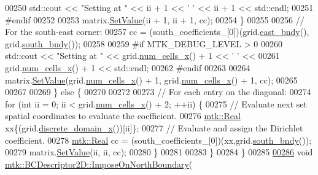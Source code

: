 \begin{DoxyCode}
00250       std::cout << \textcolor{stringliteral}{"Setting at "} << ii + 1 << \textcolor{charliteral}{' '} << ii + 1 << std::endl;
00251 \textcolor{preprocessor}{      #endif}
00252 
00253       matrix.\hyperlink{classmtk_1_1DenseMatrix_a784ce5784109ac86bfb9d8562b334b13}{SetValue}(ii + 1, ii + 1, cc);
00254     \}
00255 
00256     \textcolor{comment}{// For the south-east corner:}
00257     cc = (south\_coefficients\_[0])(grid.\hyperlink{classmtk_1_1UniStgGrid2D_a03f689eb29a6369b82ce1207c655d5ff}{east\_bndy}(), grid.\hyperlink{classmtk_1_1UniStgGrid2D_a1442eaf219f099d0ebf46a170fdebf92}{south\_bndy}());
00258 
00259 \textcolor{preprocessor}{    #if MTK\_DEBUG\_LEVEL > 0}
00260     std::cout << \textcolor{stringliteral}{"Setting at "} << grid.\hyperlink{classmtk_1_1UniStgGrid2D_a2d182866a398aba8e4829590e85bf939}{num\_cells\_x}() + 1 << \textcolor{charliteral}{' '} <<
00261       grid.\hyperlink{classmtk_1_1UniStgGrid2D_a2d182866a398aba8e4829590e85bf939}{num\_cells\_x}() + 1 << std::endl;
00262 \textcolor{preprocessor}{    #endif}
00263 
00264     matrix.\hyperlink{classmtk_1_1DenseMatrix_a784ce5784109ac86bfb9d8562b334b13}{SetValue}(grid.\hyperlink{classmtk_1_1UniStgGrid2D_a2d182866a398aba8e4829590e85bf939}{num\_cells\_x}() + 1, grid.\hyperlink{classmtk_1_1UniStgGrid2D_a2d182866a398aba8e4829590e85bf939}{num\_cells\_x}() + 1, cc);
00265 
00267 
00269   \} \textcolor{keywordflow}{else} \{
00270 
00272 
00273     \textcolor{comment}{// For each entry on the diagonal:}
00274     \textcolor{keywordflow}{for} (\textcolor{keywordtype}{int} ii = 0; ii < grid.\hyperlink{classmtk_1_1UniStgGrid2D_a2d182866a398aba8e4829590e85bf939}{num\_cells\_x}() + 2; ++ii) \{
00275       \textcolor{comment}{// Evaluate next set spatial coordinates to evaluate the coefficient.}
00276       \hyperlink{group__c01-roots_gac080bbbf5cbb5502c9f00405f894857d}{mtk::Real} xx\{(grid.\hyperlink{classmtk_1_1UniStgGrid2D_ab2f70cf5cd0a2d5486992d9f2f8baa4a}{discrete\_domain\_x}())[ii]\};
00277       \textcolor{comment}{// Evaluate and assign the Dirichlet coefficient.}
00278       \hyperlink{group__c01-roots_gac080bbbf5cbb5502c9f00405f894857d}{mtk::Real} cc = (south\_coefficients\_[0])(xx,grid.\hyperlink{classmtk_1_1UniStgGrid2D_a1442eaf219f099d0ebf46a170fdebf92}{south\_bndy}());
00279       matrix.\hyperlink{classmtk_1_1DenseMatrix_a784ce5784109ac86bfb9d8562b334b13}{SetValue}(ii, ii, cc);
00280     \}
00281 
00283   \}
00284 \}
00285 
\hypertarget{mtk__bc__descriptor__2d_8cc_source_l00286}{}\hyperlink{classmtk_1_1BCDescriptor2D_a6062894dbe7c6f42a3bbcc54f2f8973d}{00286} \textcolor{keywordtype}{void} \hyperlink{classmtk_1_1BCDescriptor2D_a6062894dbe7c6f42a3bbcc54f2f8973d}{mtk::BCDescriptor2D::ImposeOnNorthBoundary}(

\end{DoxyCode}

